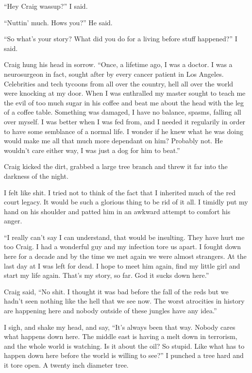 ``Hey Craig wassup?'' I said.

``Nuttin' much. Hows you?'' He said.

``So what's your story? What did you do for a living before stuff happened?'' I said.

Craig hung his head in sorrow. ``Once, a lifetime ago, I was a doctor. I was a neurosurgeon in fact, sought after by every cancer patient in Los Angeles. Celebrities and tech tycoons from all over the country, hell all over the world were knocking at my door. When I was enthralled my master sought to teach me the evil of too much sugar in his coffee and beat me about the head with the leg of a coffee table. Something was damaged, I have no balance, spasms, falling all over myself. I was better when I was fed from, and I needed it regularily in order to have some semblance of a normal life. I wonder if he knew what he was doing would make me all that much more dependant on him? Probably not. He wouldn't care either way, I was just a dog for him to beat.''

Craig kicked the dirt, grabbed a large tree branch and threw it far into the darkness of the night.

I felt like shit. I tried not to think of the fact that I inherited much of the red court legacy. It would be such a glorious thing to be rid of it all. I timidly put my hand on his shoulder and patted him in an awkward attempt to comfort his anger.

``I really can't say I can understand, that would be insulting. They have hurt me too Craig. I had a wonderful guy and my infection tore us apart. I fought down here for a decade and by the time we met again we were almost strangers. At the last day at \chichenitza* I was left for dead. I hope to meet him again, find my little girl and start my life again. That's my story, so far. God it sucks down here.''

Craig said, ``No shit. I thought it was bad before the fall of the reds but we hadn't seen nothing like the hell that we see now. The worst atrocities in history are happening here and nobody outside of these jungles have any idea.''

I sigh, and shake my head, and say, ``It's always been that way. Nobody cares what happens down here. The middle east is having a melt down in terrorism, and the whole world is watching. Is it about the oil? So stupid. Like what has to happen down here before the world is willing to see?'' I punched a tree hard and it tore open. A twenty inch diameter tree.

